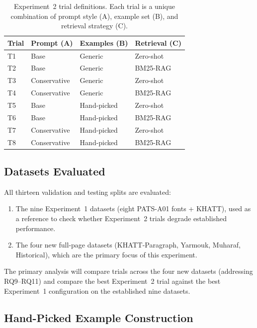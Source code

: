 \begin{table}[ht]
\caption{Experiment~2 trial definitions. Each trial is a unique combination
         of prompt style (A), example set (B), and retrieval strategy (C).}
\label{tab:exp2_trials}
\centering
\renewcommand{\arraystretch}{1.3}
\begin{tabularx}{\linewidth}{lXXX}
\toprule
\textbf{Trial} & \textbf{Prompt (A)} & \textbf{Examples (B)} & \textbf{Retrieval (C)} \\
\midrule
T1 & Base       & Generic     & Zero-shot \\
T2 & Base       & Generic     & BM25-RAG  \\
T3 & Conservative & Generic   & Zero-shot \\
T4 & Conservative & Generic   & BM25-RAG  \\
T5 & Base       & Hand-picked & Zero-shot \\
T6 & Base       & Hand-picked & BM25-RAG  \\
T7 & Conservative & Hand-picked & Zero-shot \\
T8 & Conservative & Hand-picked & BM25-RAG  \\
\bottomrule
\end{tabularx}
\end{table}

\subsection{Datasets Evaluated}
\label{subsec:exp2_datasets}

All thirteen validation and testing splits are evaluated:
\begin{enumerate}
  \item The nine Experiment~1 datasets (eight PATS-A01 fonts + KHATT), used
        as a reference to check whether Experiment~2 trials degrade established
        performance.
  \item The four new full-page datasets (KHATT-Paragraph, Yarmouk, Muharaf,
        Historical), which are the primary focus of this experiment.
\end{enumerate}

The primary analysis will compare trials across the four new datasets
(addressing RQ9--RQ11) and compare the best Experiment~2 trial against
the best Experiment~1 configuration on the established nine datasets.

\subsection{Hand-Picked Example Construction}
\label{subsec:exp2_examples}


